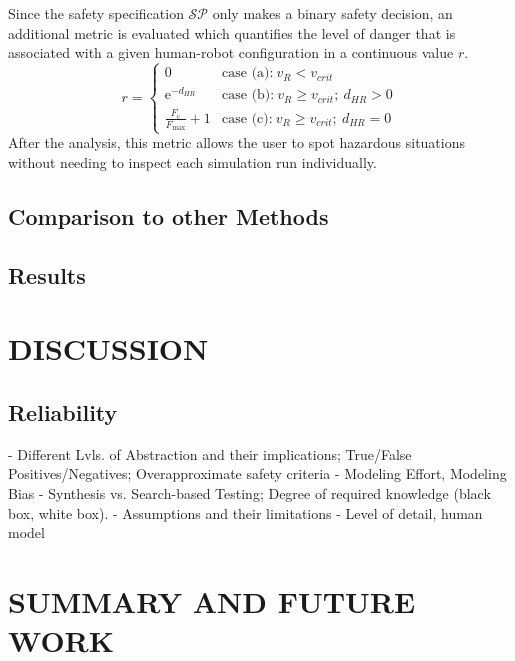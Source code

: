 \documentclass[letterpaper, 10 pt, conference]{ieeeconf}  %
\begin{document}
Since the safety specification $\mathcal{SP}$ only makes a binary safety decision, an additional metric is evaluated which quantifies the level of danger that is associated with a given human-robot configuration in a continuous value $r$.
\begin{equation}
	r = \begin{cases} 0 & \text{case (a):}\ v_R < v_{crit} \\
		\text{e}^{-d_{HR}} & \text{case (b):}\ v_R \geq  v_{crit};\ d_{HR}>0\\
		\frac{F_{\mathrm{c}}}{F_{\mathrm{max}}}+1 & \text{case (c):}\ v_R \geq  v_{crit};\ d_{HR}=0
	\end{cases}
	\label{eq:RiskMetric}
\end{equation}
After the analysis, this metric allows the user to spot hazardous situations without needing to inspect each simulation run individually.

\subsection{Comparison to other Methods}

\subsection{Results}

\section{DISCUSSION}
\label{sec:discussion}
\subsection{Reliability}
- Different Lvls. of Abstraction and their implications; True/False Positives/Negatives; Overapproximate safety criteria
- Modeling Effort, Modeling Bias
- Synthesis vs. Search-based Testing; Degree of required knowledge (black box, white box).
- Assumptions and their limitations
- Level of detail, human model
\subsection{}

\section{SUMMARY AND FUTURE WORK}
\end{document}
